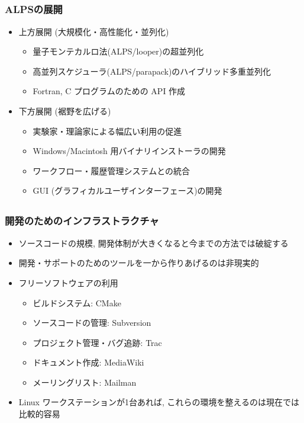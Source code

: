 \subsection*{\redm\whitem\greenb}
\begin{frame}
  \frametitle{ALPSの展開}
  \begin{itemize}
    \setlength{\itemsep}{1em}
  \item 上方展開 (大規模化・高性能化・並列化)
    \begin{itemize}
    \item 量子モンテカルロ法(ALPS/looper)の超並列化
    \item 高並列スケジューラ(ALPS/parapack)のハイブリッド多重並列化
    \item Fortran, C プログラムのための API 作成
    \end{itemize}
  \item 下方展開 (裾野を広げる)
    \begin{itemize}
    \item 実験家・理論家による幅広い利用の促進
    \item Windows/Macintosh 用バイナリインストーラの開発
    \item ワークフロー・履歴管理システムとの統合
    \item GUI (グラフィカルユーザインターフェース)の開発
    \end{itemize}
  \end{itemize}
\end{frame}

\subsection*{\redm\whitem\greenb}
\begin{frame}
  \frametitle{開発のためのインフラストラクチャ}
  \begin{itemize}
  \item ソースコードの規模, 開発体制が大きくなると今までの方法では破綻する
  \item 開発・サポートのためのツールを一から作りあげるのは非現実的
  \item フリーソフトウェアの利用
    \begin{itemize}
    \item ビルドシステム: CMake
    \item ソースコードの管理: Subversion
    \item プロジェクト管理・バグ追跡: Trac
    \item ドキュメント作成: MediaWiki
    \item メーリングリスト: Mailman
    \end{itemize}
  \item Linux ワークステーションが1台あれば, これらの環境を整えるのは現在では比較的容易
  \end{itemize}
\end{frame}

